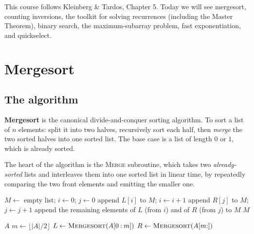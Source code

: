 \documentclass[11pt]{article}
\begin{document}
This course follows Kleinberg \& Tardos, Chapter 5. Today we will see mergesort, counting
inversions, the toolkit for solving recurrences (including the Master Theorem), binary
search, the maximum-subarray problem, fast exponentiation, and quickselect.

\section{Mergesort}

\subsection{The algorithm}

\textbf{Mergesort} is the canonical divide-and-conquer sorting algorithm. To sort a list
of $n$ elements: split it into two halves, recursively sort each half, then \emph{merge}
the two sorted halves into one sorted list. The base case is a list of length $0$ or $1$,
which is already sorted.

The heart of the algorithm is the \textsc{Merge} subroutine, which takes two
\emph{already-sorted} lists and interleaves them into one sorted list in linear time, by
repeatedly comparing the two front elements and emitting the smaller one.

\begin{algorithm}[h]
\caption{Merge two sorted lists}
\begin{algorithmic}[1]
 
    \State $M \gets$ empty list; $i \gets 0$; $j \gets 0$
            \State append $L[i]$ to $M$; $i \gets i + 1$
        \Else
            \State append $R[j]$ to $M$; $j \gets j + 1$
        \EndIf
    \EndWhile
    \State append the remaining elements of $L$ (from $i$) and of $R$ (from $j$) to $M$
    \State \Return $M$
\EndFunction
\end{algorithmic}
\end{algorithm}

\begin{algorithm}[h]
\caption{Mergesort}
\begin{algorithmic}[1]
        \State \Return $A$ 
    \EndIf
    \State $m \gets \lfloor |A| / 2 \rfloor$
    \State $L \gets \Call{Mergesort}{A[0 \mathbin{:} m]}$
    \State $R \gets \Call{Mergesort}{A[m \mathbin{:} ]}$
    \State \Return {}
\EndFunction
\end{algorithmic}
\end{algorithm}
\end{document}
